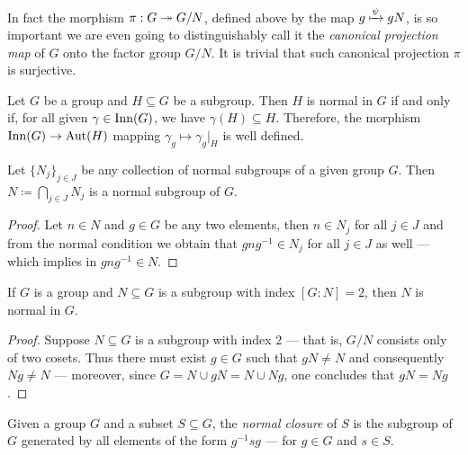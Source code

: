 In fact the morphism \(\pi: G \twoheadrightarrow G/N\), defined above by the map \(g \xmapsto
\psi g N\), is so important we are even going to distinguishably call it the
\emph{canonical projection map} of \(G\) onto the factor group \(G/N\). It is
trivial that such canonical projection \(\pi\) is surjective.

\begin{corollary}
    \label{prop:normal-and-inner-automorphism-group}
    Let \(G\) be a group and \(H \subseteq G\) be a subgroup. Then \(H\) is normal
    in \(G\) if and only if, for all given \(\gamma \in \operatorname{Inn}(G)\), we have
    \(\gamma(H) \subseteq H\). Therefore, the morphism \(\operatorname{Inn}(G) \to \operatorname{Aut}(H)\)
    mapping \(\gamma_g \mapsto \gamma_g|_H\) is well defined.
\end{corollary}

\begin{corollary}
    \label{cor:intersection-normal-subgroups}
    Let \(\{N_{j}\}_{j \in J}\) be any collection of normal subgroups of a given
    group \(G\). Then \(N \coloneq \bigcap_{j \in J} N_j\) is a normal subgroup of
    \(G\).
\end{corollary}

\begin{proof}
    Let \(n \in N\) and \(g \in G\) be any two elements, then \(n \in N_j\) for all
    \(j \in J\) and from the normal condition we obtain that \(g n g^{-1} \in N_j\)
    for all \(j \in J\) as well --- which implies in \(g n g^{-1} \in N\).
\end{proof}

\begin{proposition}
    \label{prop:index-2-is-normal}
    If \(G\) is a group and \(N \subseteq G\) is a subgroup with index
    \([G \colon N] = 2\), then \(N\) is normal in \(G\).
\end{proposition}

\begin{proof}
    Suppose \(N \subseteq G\) is a subgroup with index \(2\) --- that is, \(G/N\)
    consists only of two cosets. Thus there must exist \(g \in G\) such that
    \(g N \neq N\) and consequently \(N g \neq N\) --- moreover, since
    \(G = N \cup g N = N \cup N g\), one concludes that \(g N = N g\).
\end{proof}

\begin{definition}
    \label{def:normal-closure}
    Given a group \(G\) and a subset \(S \subseteq G\), the \emph{normal closure} of
    \(S\) is the subgroup of \(G\) generated by all elements of the form \(g^{-1} s
    g\) --- for \(g \in G\) and \(s \in S\).
\end{definition}


